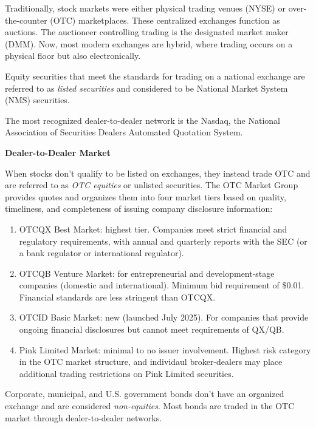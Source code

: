 Traditionally, stock markets were either physical trading venues (NYSE) or over-the-counter (OTC) marketplaces. These centralized exchanges function as auctions. The auctioneer controlling trading is the designated market maker (DMM). Now, most modern exchanges are hybrid, where trading occurs on a physical floor but also electronically. 

Equity securities that meet the standards for trading on a national exchange are referred to as \textit{listed securities} and considered to be National Market System (NMS) securities. 

The most recognized dealer-to-dealer network is the Nasdaq, the National Association of Securities Dealers Automated Quotation System.

\medskip

\textbf{Dealer-to-Dealer Market}

When stocks don't qualify to be listed on exchanges, they instead trade OTC and are referred to as \textit{OTC equities} or unlisted securities. The OTC Market Group provides quotes and organizes them into four market tiers based on quality, timeliness, and completeness of issuing company disclosure information:
\vspace{-1.5ex}
\begin{enumerate}[itemsep=0.4em]
  \item OTCQX Best Market: highest tier. Companies meet strict financial and regulatory requirements, with annual and quarterly reports with the SEC (or a bank regulator or international regulator). 
  \item OTCQB Venture Market: for entrepreneurial and development-stage companies (domestic and international). Minimum bid requirement of \$0.01. Financial standards are less stringent than OTCQX.
  \item OTCID Basic Market: new (launched July 2025). For companies that provide ongoing financial disclosures but cannot meet requirements of QX/QB.
  \item Pink Limited Market: minimal to no issuer involvement. Highest risk category in the OTC market structure, and individaul broker-dealers may place additional trading restrictions on Pink Limited securities.
\end{enumerate}

Corporate, municipal, and U.S. government bonds don't have an organized exchange and are considered \textit{non-equities}. Most bonds are traded in the OTC market through dealer-to-dealer networks.

